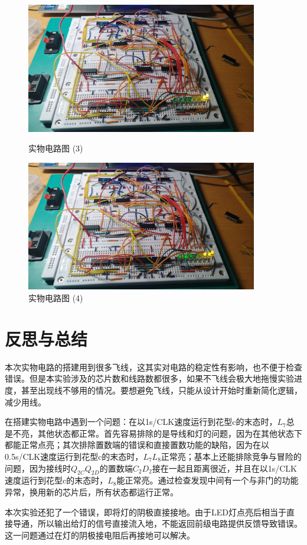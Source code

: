 \documentclass{ctexart}
\begin{document}
\begin{figure}[H]
    \centering
    \begin{minipage}{0.45\textwidth}
    \centering
    \includegraphics[width=0.9\textwidth]{实物电路图 (3).jpg}
    \caption{实物电路图 (3)}
    \label{}
    \end{minipage}
    \hspace{0.05\textwidth}
    \begin{minipage}{0.45\textwidth}
    \centering
    \includegraphics[width=0.9\textwidth]{实物电路图 (4).jpg}
    \caption{实物电路图 (4)}
    \label{7474}
    \end{minipage}
\end{figure}
\section{反思与总结}
本次实物电路的搭建用到很多飞线，这其实对电路的稳定性有影响，也不便于检查错误。但是本实验涉及的芯片数和线路数都很多，如果不飞线会极大地拖慢实验进度，甚至出现线不够用的情况。要想避免飞线，只能从设计开始时重新简化逻辑，减少用线。

在搭建实物电路中遇到一个问题：在以1s/CLK速度运行到花型c的末态时，$L_7$总是不亮，其他状态都正常。首先容易排除的是导线和灯的问题，因为在其他状态下都能正常点亮；其次排除置数端的错误和直接置数功能的缺陷，因为在以0.5s/CLK速度运行到花型c的末态时，$L_7L_8$正常亮；基本上还能排除竞争与冒险的问题，因为接线时$Q_{2C}Q_{2D}$的置数端$C_2 D_2$接在一起且距离很近，并且在以1s/CLK速度运行到花型c的末态时，$L_8$能正常亮。通过检查发现中间有一个与非门的功能异常，换用新的芯片后，所有状态都运行正常。

本次实验还犯了一个错误，即将灯的阴极直接接地。由于LED灯点亮后相当于直接导通，所以输出给灯的信号直接流入地，不能返回前级电路提供反馈导致错误。这一问题通过在灯的阴极接电阻后再接地可以解决。
\end{document}
